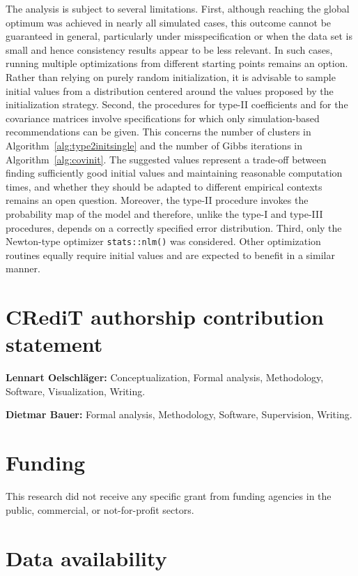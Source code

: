 \documentclass[preprint,12pt,authoryear]{elsarticle}
\begin{document}
The analysis is subject to several limitations. First, although reaching the global optimum was achieved in nearly all simulated cases, this outcome cannot be guaranteed in general, particularly under misspecification or when the data set is small and hence consistency results appear to be less relevant. In such cases, running multiple optimizations from different starting points remains an option. Rather than relying on purely random initialization, it is advisable to sample initial values from a distribution centered around the values proposed by the initialization strategy. Second, the procedures for type-II coefficients and for the covariance matrices involve specifications for which only simulation-based recommendations can be given. This concerns the number of clusters in Algorithm~\ref{alg:type2initsingle} and the number of Gibbs iterations in Algorithm~\ref{alg:covinit}. The suggested values represent a trade-off between finding sufficiently good initial values and maintaining reasonable computation times, and whether they should be adapted to different empirical contexts remains an open question. Moreover, the type-II procedure invokes the probability map of the model and therefore, unlike the type-I and type-III procedures, depends on a correctly specified error distribution. Third, only the Newton-type optimizer \texttt{stats::nlm()} was considered. Other optimization routines equally require initial values and are expected to benefit in a similar manner.

\section*{CRediT authorship contribution statement}

\textbf{Lennart Oelschläger:} Conceptualization, Formal analysis, Methodology, Software, Visualization, Writing.

\textbf{Dietmar Bauer:} Formal analysis, Methodology, Software, Supervision, Writing.

\section*{Funding}

This research did not receive any specific grant from funding agencies in the public, commercial, or not-for-profit sectors.

\section*{Data availability}
\end{document}
